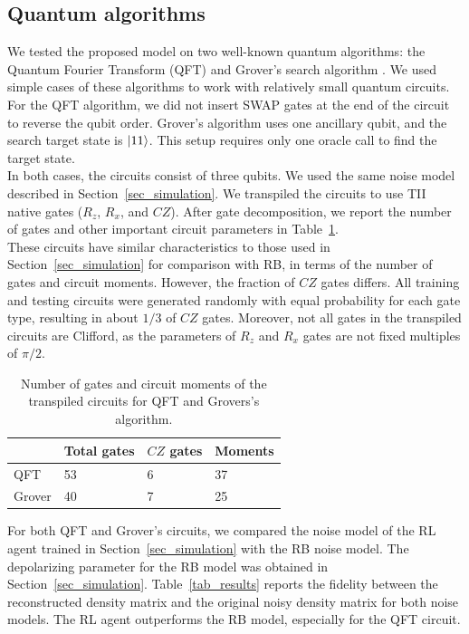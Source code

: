 \documentclass[sn-basic]{sn-jnl} %
\begin{document}
\subsection{Quantum algorithms}
We tested the proposed model on two well-known quantum algorithms: the Quantum Fourier Transform (QFT) 
\cite{Shor_1997} and Grover's search algorithm \cite{grover1996fast}. We used simple cases of these 
algorithms to work with relatively small quantum circuits.\\
For the QFT algorithm, we did not insert SWAP gates at the end of the circuit to reverse the qubit order. 
Grover's algorithm uses one ancillary qubit, and the search target state is $\ket{11}$. This setup requires only 
one oracle call to find the target state.\\
In both cases, the circuits consist of three qubits. We used the same noise model described in 
Section~\ref{sec_simulation}. We transpiled the circuits to use TII native gates ($R_z$, $R_x$, and $CZ$). 
After gate decomposition, we report the number of gates and other important circuit parameters in 
Table~\ref{tab_gates}.\\
These circuits have similar characteristics to those used in Section~\ref{sec_simulation} for comparison 
with RB, in terms of the number of gates and circuit moments. However, the fraction of $CZ$ gates differs. 
All training and testing circuits were generated randomly with equal probability for each gate type, 
resulting in about $1/3$ of $CZ$ gates.
Moreover, not all gates in the transpiled circuits are Clifford, as the parameters of $R_z$ and $R_x$ gates 
are not fixed multiples of $\pi/2$.

\begin{table}[ht]
\centering
\caption{Number of gates and circuit moments of the transpiled circuits for QFT and Grovers's algorithm.}
\label{tab_gates}
\begin{tabular}{@{}llll@{}}
\toprule
& Total gates & $CZ$ gates & Moments \\
\midrule
QFT & 53 & 6 & 37 \\
Grover & 40 & 7 & 25 \\
\bottomrule
\end{tabular}
\end{table}

\noindent
For both QFT and Grover's circuits, we compared the noise model of the RL agent trained in 
Section~\ref{sec_simulation} with the RB noise model. The depolarizing parameter for the RB model was 
obtained in Section~\ref{sec_simulation}. 
Table~\ref{tab_results} reports the fidelity between the reconstructed density matrix and the original 
noisy density matrix for both noise models. The RL agent outperforms the RB model, especially for the QFT 
circuit.
\end{document}
